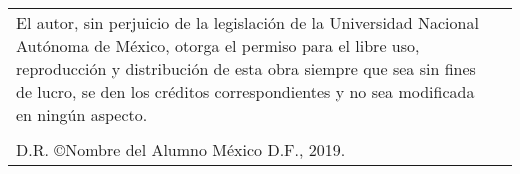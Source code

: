 
\newpage
\vspace*{19cm}
\begin{tabular*}{\textwidth}{p{10cm} p{5cm}}
El autor, sin perjuicio de la legislación de la Universidad Nacional Autónoma de México, otorga el permiso para el libre uso, reproducción y distribución de esta obra siempre que sea sin fines de lucro, se den los créditos correspondientes y no sea modificada en ningún aspecto.&  \\
& \\
D.R. \copyright Nombre del Alumno \hspace{1cm} México D.F., 2019. & \\
\end{tabular*}


